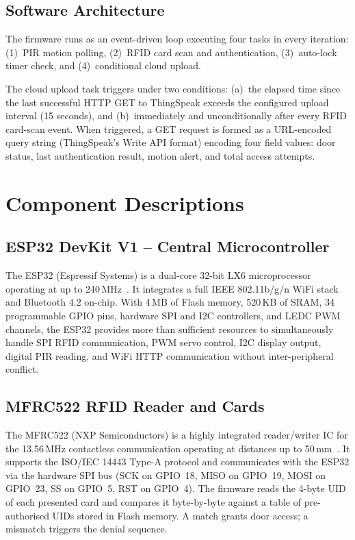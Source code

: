 \documentclass[12pt,a4paper]{article}
\begin{document}
\subsection{Software Architecture}

The firmware runs as an event-driven loop executing four
tasks in every iteration: (1)~PIR motion polling,
(2)~RFID card scan and authentication, (3)~auto-lock timer check,
and (4)~conditional cloud upload.

The cloud upload task triggers under two conditions: (a)~the elapsed
time since the last successful HTTP GET to ThingSpeak exceeds the
configured upload interval (15 seconds), and (b)~immediately and
unconditionally after every RFID card-scan event. When triggered, a
GET request is formed as a URL-encoded query string (ThingSpeak's
Write API format) encoding four field values: door status, last
authentication result, motion alert, and total access attempts.

\section{Component Descriptions}
\label{sec:components}

\subsection{ESP32 DevKit V1 -- Central Microcontroller}

The ESP32 (Espressif Systems) is a dual-core 32-bit LX6
microprocessor operating at up to 240\,MHz~\cite{esp32ds2023}.
It integrates a full IEEE 802.11b/g/n WiFi stack and
Bluetooth 4.2 on-chip. With 4\,MB of Flash memory, 520\,KB of
SRAM, 34 programmable GPIO pins, hardware SPI and I2C controllers,
and LEDC PWM channels, the ESP32 provides more than sufficient resources
to simultaneously handle SPI RFID communication, PWM servo control,
I2C display output, digital PIR reading, and WiFi HTTP communication
without inter-peripheral conflict.

\subsection{MFRC522 RFID Reader and Cards}

The MFRC522 (NXP Semiconductors) is a highly integrated reader/writer IC
for the 13.56\,MHz contactless communication operating at distances
up to 50\,mm~\cite{mfrc522ds2016}. It supports the ISO/IEC 14443
Type-A protocol and communicates with the ESP32 via the hardware SPI bus
(SCK on GPIO~18, MISO on GPIO~19, MOSI on GPIO~23, SS on GPIO~5,
RST on GPIO~4). The firmware reads the 4-byte UID of each presented
card and compares it byte-by-byte against a table of pre-authorised UIDs
stored in Flash memory. A match grants door access; a mismatch triggers
the denial sequence.
\end{document}
